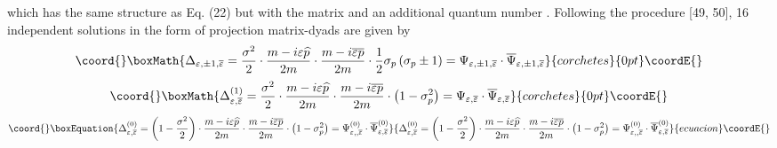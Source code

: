 \documentclass[a4paper,12pt]{article}
\begin{document}
which has the same structure as Eq. (22) but with the matrix
\coordHE{} and an additional
quantum number \coordHE{}. Following the
procedure [49, 50], 16 independent solutions in the form of
projection matrix-dyads are given by
\[\coord{}\boxMath{
\Delta _{\varepsilon ,\pm 1,\overline{\varepsilon }}=\frac{\sigma
^2}2\cdot \frac{m-i\varepsilon \widehat{p}}{2m}\cdot
\frac{m-i\overline{\varepsilon } \overline{p}}{2m}\cdot \frac
12\sigma _p\left( \sigma _p\pm 1\right) =\Psi _{\varepsilon ,\pm
1,\overline{\varepsilon }}\cdot \overline{\Psi } _{\varepsilon
,\pm 1,\overline{\varepsilon }}
}{corchetes}{0pt}\coordE{}\]
\[\coord{}\boxMath{
\Delta _{\varepsilon ,\overline{\varepsilon }}^{(1)}=\frac{\sigma
^2}2\cdot \frac{m-i\varepsilon \widehat{p}}{2m}\cdot
\frac{m-i\overline{\varepsilon } \overline{p}}{2m}\cdot \left(
1-\sigma _p^2\right) =\Psi _{\varepsilon , \overline{\varepsilon
}}\cdot \overline{\Psi }_{\varepsilon ,\overline{ \varepsilon }}
}{corchetes}{0pt}\coordE{}\]
\begin{equation}\coord{}\boxEquation{
\Delta _{\varepsilon ,\overline{\varepsilon }}^{(0)}=\left(
1-\frac{\sigma ^2 }2\right) \cdot \frac{m-i\varepsilon
\widehat{p}}{2m}\cdot \frac{m-i \overline{\varepsilon
}\overline{p}}{2m}\cdot \left( 1-\sigma _p^2\right) =\Psi
_{\varepsilon ,,\overline{\varepsilon }}^{(0)}\cdot \overline{\Psi
} _{\varepsilon ,\overline{\varepsilon }}^{(0)}  \label{33}
}{
\Delta _{\varepsilon ,\overline{\varepsilon }}^{(0)}=\left(
1-\frac{\sigma ^2 }2\right) \cdot \frac{m-i\varepsilon
\widehat{p}}{2m}\cdot \frac{m-i \overline{\varepsilon
}\overline{p}}{2m}\cdot \left( 1-\sigma _p^2\right) =\Psi
_{\varepsilon ,,\overline{\varepsilon }}^{(0)}\cdot \overline{\Psi
} _{\varepsilon ,\overline{\varepsilon }}^{(0)}  }{ecuacion}\coordE{}\end{equation}
\end{document}
